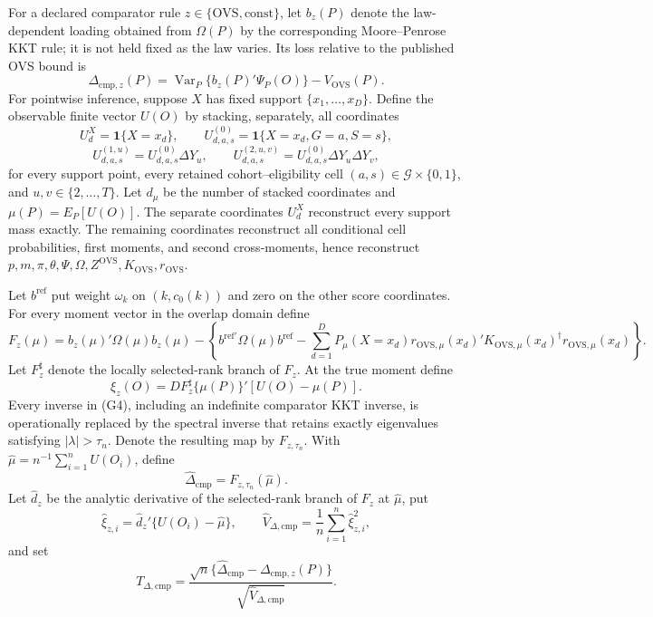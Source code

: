For a declared comparator rule \(z\in\{\mathrm{OVS},\mathrm{const}\}\), let \(b_z(P)\) denote the law-dependent loading obtained from \(\Omega(P)\) by the corresponding Moore--Penrose KKT rule; it is not held fixed as the law varies.  Its loss relative to the published OVS bound is
\[
\Delta_{\mathrm{cmp},z}(P)
=\operatorname{Var}_P\{b_z(P)'\Psi_P(O)\}-V_{\mathrm{OVS}}(P).
\tag{G1}
\]
For pointwise inference, suppose \(X\) has fixed support \(\{x_1,\ldots,x_D\}\).  Define the observable finite vector \(U(O)\) by stacking, separately, all coordinates
\[
U_d^X=\mathbf 1\{X=x_d\},
\qquad
U^{(0)}_{d,a,s}=\mathbf 1\{X=x_d,G=a,S=s\},
\tag{G2}
\]
\[
U^{(1,u)}_{d,a,s}=U^{(0)}_{d,a,s}\Delta Y_u,
\qquad
U^{(2,u,v)}_{d,a,s}=U^{(0)}_{d,a,s}\Delta Y_u\Delta Y_v,
\tag{G3}
\]
for every support point, every retained cohort--eligibility cell \((a,s)\in\mathcal G\times\{0,1\}\), and \(u,v\in\{2,\ldots,T\}\).  Let \(d_\mu\) be the number of stacked coordinates and \(\mu(P)=E_P[U(O)]\).  The separate coordinates \(U_d^X\) reconstruct every support mass exactly.  The remaining coordinates reconstruct all conditional cell probabilities, first moments, and second cross-moments, hence reconstruct \(p,m,\pi,\theta,\Psi,\Omega,Z^{\mathrm{OVS}},K_{\mathrm{OVS}},r_{\mathrm{OVS}}\).

Let \(b^{\mathrm{ref}}\) put weight \(\omega_k\) on \((k,c_0(k))\) and zero on the other score coordinates.  For every moment vector in the overlap domain define
\[
F_z(\mu)=b_z(\mu)'\Omega(\mu)b_z(\mu)
-\left\{b^{\mathrm{ref}\prime}\Omega(\mu)b^{\mathrm{ref}}
-\sum_{d=1}^D P_\mu(X=x_d)
r_{\mathrm{OVS},\mu}(x_d)'K_{\mathrm{OVS},\mu}(x_d)^\dagger
r_{\mathrm{OVS},\mu}(x_d)\right\}.
\tag{G4}
\]
Let \(F_z^\sharp\) denote the locally selected-rank branch of \(F_z\).  At the true moment define
\[
\xi_z(O)=DF_z^\sharp\{\mu(P)\}'[U(O)-\mu(P)].
\tag{G5}
\]
Every inverse in (G4), including an indefinite comparator KKT inverse, is operationally replaced by the spectral inverse that retains exactly eigenvalues satisfying \(|\lambda|>\tau_n\).  Denote the resulting map by \(F_{z,\tau_n}\).  With \(\widehat\mu=n^{-1}\sum_{i=1}^nU(O_i)\), define
\[
\widehat\Delta_{\mathrm{cmp}}=F_{z,\tau_n}(\widehat\mu).
\tag{G6}
\]
Let \(\widehat d_z\) be the analytic derivative of the selected-rank branch of \(F_z\) at \(\widehat\mu\), put
\[
\widehat\xi_{z,i}=\widehat d_z'\{U(O_i)-\widehat\mu\},
\qquad
\widehat V_{\Delta,\mathrm{cmp}}=\frac1n\sum_{i=1}^n\widehat\xi_{z,i}^2,
\tag{G7}
\]
and set
\[
T_{\Delta,\mathrm{cmp}}
=\frac{\sqrt n\{\widehat\Delta_{\mathrm{cmp}}-\Delta_{\mathrm{cmp},z}(P)\}}
{\sqrt{\widehat V_{\Delta,\mathrm{cmp}}}}.
\tag{G8}
\]
